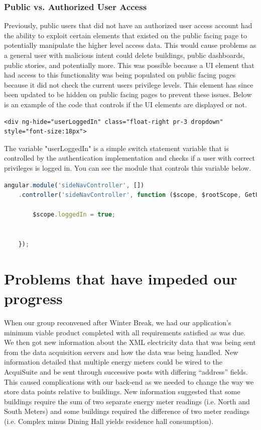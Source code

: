 \documentclass[letterpaper,10pt,serif,draftclsnofoot,onecolumn,compsoc,titlepage]{IEEEtran}
\begin{document}
\subsubsection{Public vs. Authorized User Access}
Previously, public users that did not have an authorized user access account had the ability to exploit certain elements that existed on the public facing page to potentially manipulate the higher level access data. This would cause problems as a general user with malicious intent could delete buildings, public dashboards, public stories, and potentially more. This was possible because a UI element that had access to this functionality was being populated on public facing pages because it did not check the current users privilege levels. This element has since been updated to be hidden on public facing pages to prevent these issues.
Below is an example of the code that controls if the UI elements are displayed or not.
\begin{lstlisting}
<div ng-hide="userLoggedIn" class="float-right pr-3 dropdown" style="font-size:18px">
\end{lstlisting}
The variable "userLoggedIn" is a simple switch statement variable that is controlled by the authentication implementation and checks if a user with correct privileges is logged in. You can see the module that controls this variable below.
\begin{lstlisting}[language=JavaScript]
angular.module('sideNavController', [])
    .controller('sideNavController', function ($scope, $rootScope, GetUser, Story) {

        $scope.loggedIn = true;


    });
\end{lstlisting}


\section{Problems that have impeded our progress}
When our group reconvened after Winter Break, we had our application's minimum viable product completed with all requirements satisfied as was due. We then got new information about the XML electricity data that was being sent from the data acquisition servers and how the data was being handled. New information detailed that multiple energy meters could be wired to the AcquiSuite and be sent through successive posts with differing ``address'' fields. This caused complications with our back-end as we needed to change the way we store data points relative to buildings. New information suggested that some buildings require the sum of two separate energy meter readings (i.e. North and South Meters) and some buildings required the difference of two meter readings (i.e. Complex minus Dining Hall yields residence hall consumption).
\end{document}
